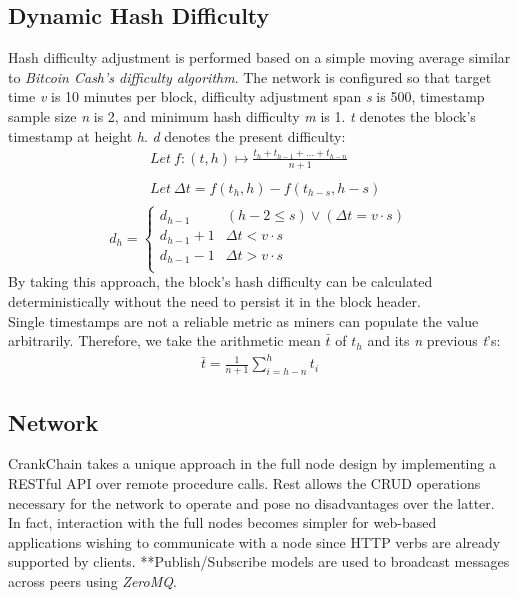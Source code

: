 \documentclass[10pt,twocolumn]{article}
\begin{document}
\subsection{Dynamic Hash Difficulty}
Hash difficulty adjustment is performed based on a simple moving average similar to \textit{Bitcoin Cash's difficulty algorithm}\cite{website:bchda}.  The network is configured so that target time \textit{v} is 10 minutes per block, difficulty adjustment span \textit{s} is 500, timestamp sample size \textit{n} is 2, and minimum hash difficulty \textit{m} is 1.  \textit{t} denotes the block's timestamp at height \textit{h}. \textit{d} denotes the present difficulty:
\begin{align*}
&Let\ {f} : (t,h)\mapsto \frac{t_h + t_{h-1} + \dots + t_{h-n}}{n+1} \\\\
&Let\ \Delta{t} = {f(t_h,h)} - {f(t_{h-s},h-s)}\\
\end{align*}
\[
d_h = 
\begin{cases}
	d_{h-1} & (h-2\leq s) \vee (\Delta{t} = v\cdot s)\\
	d_{h-1} + 1 & \Delta{t}<v\cdot s\\
	d_{h-1} - 1 & \Delta{t}>v\cdot s\\
\end{cases}
\]
By taking this approach, the block's hash difficulty can be calculated deterministically without the need to persist it in the block header.\\
Single timestamps are not a reliable metric as miners can populate the value arbitrarily. Therefore, we take the arithmetic mean $\bar{t}$ of $t_h$ and its \textit{n} previous \textit{t}'s:
\begin{align*}
\bar{t} = \frac{1}{n+1}\sum_{i=h-n}^{h} t_i
\end{align*}
\subsection{Network}
CrankChain takes a unique approach in the full node design by implementing a RESTful API over remote procedure calls.  Rest allows the CRUD operations necessary for the network to operate and pose no disadvantages over the latter.  In fact, interaction with the full nodes becomes simpler for web-based applications wishing to communicate with a node since HTTP verbs are already supported by clients.
**Publish/Subscribe models are used to broadcast messages across peers using \textit{ZeroMQ}.
\end{document}
